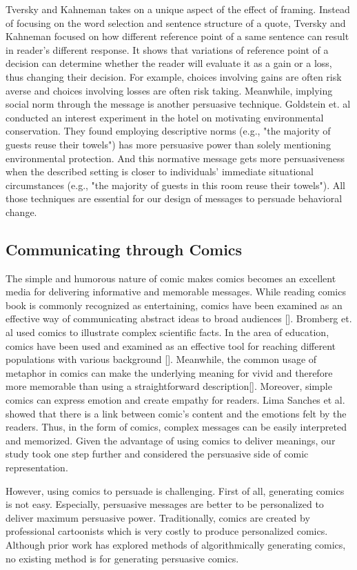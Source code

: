 Tversky and Kahneman takes on a unique aspect of the effect of framing. Instead of focusing on the word selection and sentence structure of a quote, Tversky and Kahneman focused on how different reference point of a same sentence can result in reader's different response. It shows that variations of reference point of a decision can determine whether the reader will evaluate it as a gain or a loss, thus changing their decision. For example, choices involving gains are often risk averse and choices involving losses are often risk taking. Meanwhile, implying social norm through the message is another persuasive technique.  Goldstein et. al conducted an interest experiment in the hotel on motivating environmental conservation. They found employing descriptive norms (e.g., "the majority of guests reuse their towels") has more persuasive power than solely mentioning environmental protection. And this normative message gets more persuasiveness when the described setting is closer to individuals' immediate situational circumstances (e.g., "the majority of guests in this room reuse their towels").  All those techniques are essential for our design of messages to persuade behavioral change.\par



\subsection{Communicating through Comics}
The simple and humorous nature of comic makes comics becomes an excellent media for delivering informative and memorable messages. While reading comics book is commonly recognized as entertaining, comics have been examined as an effective way of communicating abstract ideas to broad audiences []. Bromberg et. al used comics to illustrate complex scientific facts. In the area of education, comics have been used and examined as an effective tool for reaching different populations with various background []. Meanwhile, the common usage of metaphor in comics can make the underlying meaning for vivid and therefore more memorable than using a straightforward description[]. Moreover, simple comics can express emotion and create empathy for readers. Lima Sanches et al. showed that there is a link between comic’s content and the emotions felt by the readers. Thus, in the form of comics, complex messages can be easily interpreted and memorized. Given the advantage of using comics to deliver meanings, our study took one step further and considered the persuasive side of comic representation. \par

However, using comics to persuade is challenging. First of all, generating comics is not easy. Especially, persuasive messages are better to be personalized to deliver maximum persuasive power. Traditionally, comics are created by professional cartoonists which is very costly to produce personalized comics.  Although prior work has explored methods of algorithmically generating comics, no existing method is for generating persuasive comics. \par
